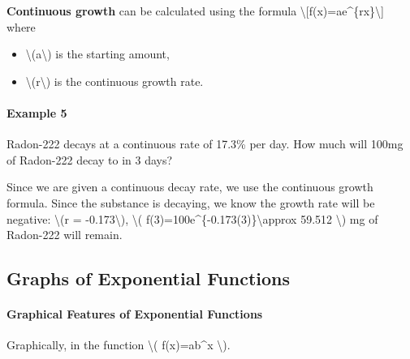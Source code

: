 \textbf{Continuous growth} can be calculated using the formula
\textbackslash{}{[}f(x)=ae\^{}\{rx\}\textbackslash{}{]} where

\begin{itemize}
\tightlist
\item
  \textbackslash{}(a\textbackslash{}) is the starting amount,
\item
  \textbackslash{}(r\textbackslash{}) is the continuous growth rate.
\end{itemize}

\hypertarget{example-5}{%
\paragraph{Example 5}\label{example-5}}

Radon-222 decays at a continuous rate of 17.3\% per day. How much will
100mg of Radon-222 decay to in 3 days?

Since we are given a continuous decay rate, we use the continuous growth
formula. Since the substance is decaying, we know the growth rate will
be negative: \textbackslash{}(r = -0.173\textbackslash{}),
\textbackslash{}( f(3)=100e\^{}\{-0.173(3)\}\textbackslash{}approx
59.512 \textbackslash{}) mg of Radon-222 will remain.

\hypertarget{graphs-of-exponential-functions}{%
\subsection{Graphs of Exponential
Functions}\label{graphs-of-exponential-functions}}

\hypertarget{graphical-features-of-exponential-functions}{%
\paragraph{Graphical Features of Exponential
Functions}\label{graphical-features-of-exponential-functions}}

Graphically, in the function \textbackslash{}( f(x)=ab\^{}x
\textbackslash{}).

